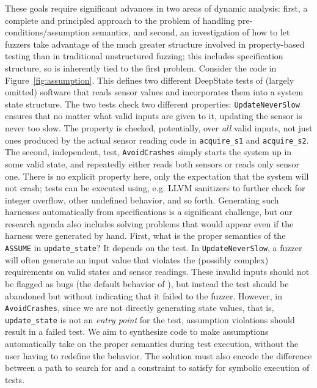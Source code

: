   These goals require significant advances in two areas of dynamic analysis: first, a complete and principled approach to the problem of handling pre-conditions/assumption semantics, and second, an investigation of how to let fuzzers take advantage of the much greater structure involved in property-based testing than in traditional unstructured fuzzing; this includes specification structure, so is inherently tied to the first problem.  Consider the code in Figure~\ref{fig:assumption}.  This defines two different DeepState tests of (largely omitted) software that reads sensor values and incorporates them into a system state structure.  The two tests check two different properties:  {\tt UpdateNeverSlow} ensures that no matter what valid inputs are given to it, updating the sensor is never too slow.  The property is checked, potentially, over \emph{all} valid inputs, not just ones produced by the actual sensor reading code in {\tt acquire\_s1} and {\tt acquire\_s2}.  The second, independent, test, {\tt AvoidCrashes} simply starts the system up in some valid state, and repeatedly either reads both sensors or reads only sensor one.  There is no explicit property here, only the expectation that the system will not crash; tests can be executed using, e.g. LLVM sanitizers to further check for integer overflow, other undefined behavior, and so forth.  Generating such harnesses automatically from \acsl specifications is a significant challenge, but our research agenda also includes solving problems that would appear even if the harness were generated by hand.  First, what is the proper semantics of the {\tt ASSUME} in {\tt update\_state}?  It depends on the test.  In {\tt UpdateNeverSlow}, a fuzzer will often generate an input value that violates the (possibly complex) requirements on valid states and sensor readings.  These invalid inputs should not be flagged as bugs (the default behavior of \eacsl), but instead the test should be abandoned but without indicating that it failed to the fuzzer.  However, in {\tt AvoidCrashes}, since we are not directly generating state values, that is, {\tt update\_state} is not an \emph{entry point} for the test, assumption violations should result in a failed test.  We aim to synthesize code to make assumptions automatically take on the proper semantics during test execution, without the user having to redefine the behavior.  The solution must also encode the difference between a path to search for and a constraint to satisfy for symbolic execution of tests.

